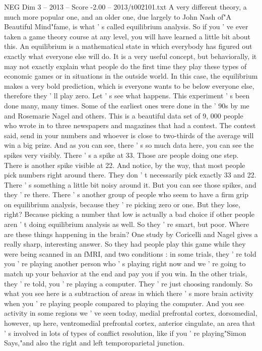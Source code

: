 \begin{textsample}{NEG Dim 3 – 2013 – Score -2.00 – 2013/t002101.txt}
A very different theory, a much more popular one, and an older one, due largely to John Nash of"A Beautiful Mind"fame, is what ' s called equilibrium analysis.
So if you ' ve ever taken a game theory course at any level, you will have learned a little bit about this.
An equilibrium is a mathematical state in which everybody has figured out exactly what everyone else will do.
It is a very useful concept, but behaviorally, it may not exactly explain what people do the first time they play these types of economic games or in situations in the outside world.
In this case, the equilibrium makes a very bold prediction, which is everyone wants to be below everyone else, therefore they ' ll play zero.
Let ' s see what happens.
This experiment ' s been done many, many times.
Some of the earliest ones were done in the ' 90s by me and Rosemarie Nagel and others.
This is a beautiful data set of 9, 000 people who wrote in to three newspapers and magazines that had a contest.
The contest said, send in your numbers and whoever is close to two-thirds of the average will win a big prize.
And as you can see, there ' s so much data here, you can see the spikes very visibly.
There ' s a spike at 33.
Those are people doing one step.
There is another spike visible at 22.
And notice, by the way, that most people pick numbers right around there.
They don ' t necessarily pick exactly 33 and 22.
There ' s something a little bit noisy around it.
But you can see those spikes, and they ' re there.
There ' s another group of people who seem to have a firm grip on equilibrium analysis, because they ' re picking zero or one.
But they lose, right?
Because picking a number that low is actually a bad choice if other people aren ' t doing equilibrium analysis as well.
So they ' re smart, but poor.
Where are these things happening in the brain?
One study by Coricelli and Nagel gives a really sharp, interesting answer.
So they had people play this game while they were being scanned in an fMRI, and two conditions : in some trials, they ' re told you ' re playing another person who ' s playing right now and we ' re going to match up your behavior at the end and pay you if you win.
In the other trials, they ' re told, you ' re playing a computer.
They ' re just choosing randomly.
So what you see here is a subtraction of areas in which there ' s more brain activity when you ' re playing people compared to playing the computer.
And you see activity in some regions we ' ve seen today, medial prefrontal cortex, dorsomedial, however, up here, ventromedial prefrontal cortex, anterior cingulate, an area that ' s involved in lots of types of conflict resolution, like if you ' re playing"Simon Says,"and also the right and left temporoparietal junction.

\end{textsample}

